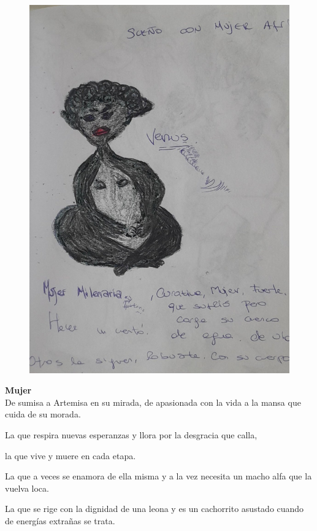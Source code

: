\documentclass[12pt, a4paper, twoside]{book} %
\begin{document}
\begin{figure}[H]
	\centering
	\includegraphics[width=\textwidth]{./images/1f81324df27a62.jpg}
\end{figure}

\clearpage

\noindent\textbf{Mujer}\\
De sumisa a Artemisa en su mirada, de apasionada con la vida a la mansa que cuida de su morada.

La que respira nuevas esperanzas y llora por la desgracia que calla,

la que vive y muere en cada etapa.

La que a veces se enamora de ella misma y a la vez necesita un macho alfa que la vuelva loca.

La que se rige con la dignidad de una leona y es un cachorrito asustado cuando de energías extrañas se trata.
\end{document}
